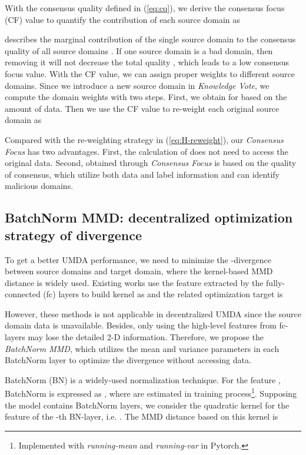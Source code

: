 \documentclass{article}
\begin{document}
With the consensus quality defined in (\ref{eq:cq}), we derive the consensus focus (CF) value to quantify the contribution of each source domain as 

 describes the marginal contribution of the single source domain  to the consensus quality of all source domains . If one source domain is a bad domain, then removing it will not decrease the total quality , which leads to a low consensus focus value. With the CF value, we can assign proper weights to different source domains. Since we introduce a new source domain  in \textit{Knowledge Vote}, we compute the domain weights with two steps. First, we obtain  for  based on the amount of data. Then we use the CF value to re-weight each original source domain as


Compared with the re-weighting strategy in (\ref{eq:H-reweight}), our \textit{Consensus Focus} has two advantages. First, the calculation of  does not need to access the original data. Second,  obtained through \textit{Consensus Focus} is based on the quality of consensus, which utilize both data and label information and can identify malicious domains.

\subsection{BatchNorm MMD: decentralized optimization strategy of divergence}
To get a better UMDA performance, we need to minimize the -divergence between source domains and target domain, where the kernel-based MMD distance is widely used. Existing works \cite{DBLP:conf/icml/LongC0J15,DBLP:conf/iccv/PengBXHSW19} use the feature  extracted by the fully-connected (fc) layers to build kernel as  and the related optimization target is

However, these methods is not applicable in decentralized UMDA since the source domain data is unavailable. Besides, only using the high-level features from fc-layers may lose the detailed 2-D information. Therefore, we propose the \textit{BatchNorm MMD}, which utilizes the mean and variance parameters in each BatchNorm layer to optimize the divergence without accessing data.

BatchNorm (BN) \citep{DBLP:conf/icml/IoffeS15} is a widely-used normalization technique. For the feature , BatchNorm is expressed as , where  are estimated in training process\footnote{Implemented with \textit{running-mean} and \textit{running-var} in Pytorch.}. Supposing the model contains  BatchNorm layers, we consider the quadratic kernel for the feature  of the -th BN-layer, i.e. . The MMD distance based on this kernel is 
\end{document}
